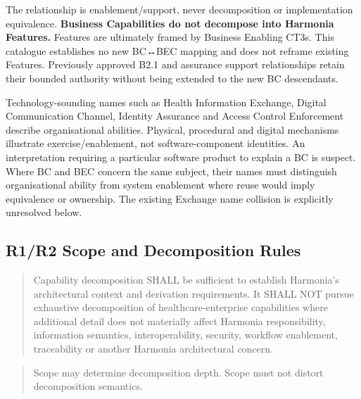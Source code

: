 The relationship is enablement/\allowbreak{}support, never decomposition or implementation equivalence. \textbf{Business Capabilities do not decompose into Harmonia Features.} Features are ultimately framed by Business Enabling CT3s. This catalogue establishes no new BC↔BEC mapping and does not reframe existing Features. Previously approved B2.1 and assurance support relationships retain their bounded authority without being extended to the new BC descendants.

\label{rad:business:30}

Technology-sounding names such as Health Information Exchange, Digital Communication Channel, Identity Assurance and Access Control Enforcement describe organisational abilities. Physical, procedural and digital mechanisms illustrate exercise/\allowbreak{}enablement, not software-component identities. An interpretation requiring a particular software product to explain a BC is suspect. Where BC and BEC concern the same subject, their names must distinguish organisational ability from system enablement where reuse would imply equivalence or ownership. The existing Exchange name collision is explicitly unresolved below.

\label{rad:business:39}
\subsection*{R1/\allowbreak{}R2 Scope and Decomposition Rules}
\label{rad:business:41}

\begin{quote}

Capability decomposition SHALL be sufficient to establish Harmonia's architectural context and derivation requirements. It SHALL NOT pursue exhaustive decomposition of healthcare-enterprise capabilities where additional detail does not materially affect Harmonia responsibility, information semantics, interoperability, security, workflow enablement, traceability or another Harmonia architectural concern.


\end{quote}
\label{rad:business:43}

\begin{quote}

Scope may determine decomposition depth. Scope must not distort decomposition semantics.


\end{quote}
\label{rad:business:45}

